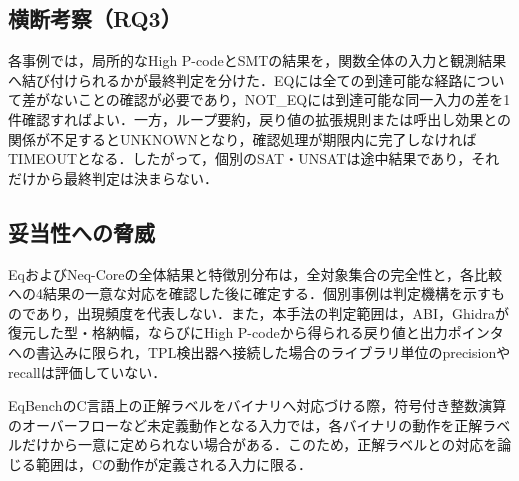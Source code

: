 \subsection{横断考察（RQ3）}
各事例では，局所的なHigh P-codeとSMTの結果を，関数全体の入力と観測結果へ結び付けられるかが最終判定を分けた．EQには全ての到達可能な経路について差がないことの確認が必要であり，NOT\_EQには到達可能な同一入力の差を1件確認すればよい．一方，ループ要約，戻り値の拡張規則または呼出し効果との関係が不足するとUNKNOWNとなり，確認処理が期限内に完了しなければTIMEOUTとなる．したがって，個別のSAT・UNSATは途中結果であり，それだけから最終判定は決まらない．

\subsection{妥当性への脅威}
EqおよびNeq-Coreの全体結果と特徴別分布は，全対象集合の完全性と，各比較への4結果の一意な対応を確認した後に確定する．個別事例は判定機構を示すものであり，出現頻度を代表しない．また，本手法の判定範囲は，ABI，Ghidraが復元した型・格納幅，ならびにHigh P-codeから得られる戻り値と出力ポインタへの書込みに限られ，TPL検出器へ接続した場合のライブラリ単位のprecisionやrecallは評価していない．

EqBenchのC言語上の正解ラベルをバイナリへ対応づける際，符号付き整数演算のオーバーフローなど未定義動作となる入力では，各バイナリの動作を正解ラベルだけから一意に定められない場合がある．このため，正解ラベルとの対応を論じる範囲は，Cの動作が定義される入力に限る．
